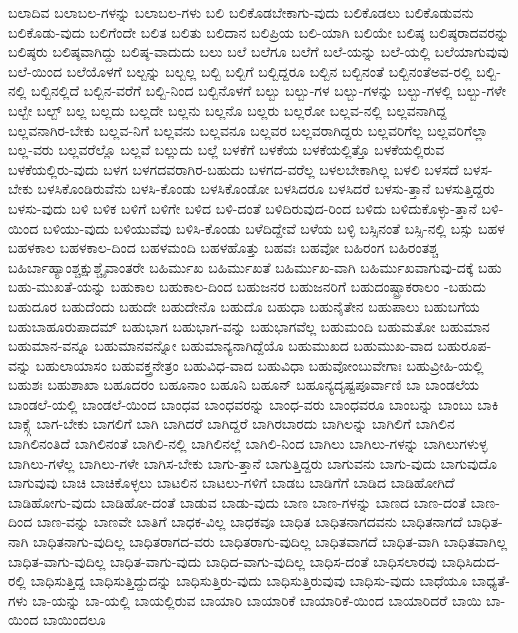 {ಬಲಾದಿವ
ಬಲಾಬಲ-ಗಳನ್ನು
ಬಲಾಬಲ-ಗಳು
ಬಲಿ
ಬಲಿಕೊಡಬೇಕಾಗು-ವುದು
ಬಲಿಕೊಡಲು
ಬಲಿಕೊಡುವನು
ಬಲಿಕೊಡು-ವುದು
ಬಲಿಗೆಂದೇ
ಬಲಿತ
ಬಲಿತು
ಬಲಿದಾನ
ಬಲಿಪ್ರಿಯ
ಬಲಿ-ಯಾಗಿ
ಬಲಿಯೇ
ಬಲಿಷ್ಠ
ಬಲಿಷ್ಠರಾದವರನ್ನು
ಬಲಿಷ್ಠರು
ಬಲಿಷ್ಠವಾಗಿದ್ದು
ಬಲಿಷ್ಠ-ವಾದುದು
ಬಲು
ಬಲೆ
ಬಲೆಗೂ
ಬಲೆಗೆ
ಬಲೆ-ಯನ್ನು
ಬಲೆ-ಯಲ್ಲಿ
ಬಲೆಯಾಗುವುವು
ಬಲೆ-ಯಿಂದ
ಬಲೆಯೊಳಗೆ
ಬಲ್ಬನ್ನು
ಬಲ್ಬಲ್ಲ
ಬಲ್ಬಿ
ಬಲ್ಬಿಗೆ
ಬಲ್ಬಿದ್ದರೂ
ಬಲ್ಬಿನ
ಬಲ್ಬಿನಂತೆ
ಬಲ್ಬಿನಂತೆಅವ-ರಲ್ಲಿ
ಬಲ್ಬಿ-ನಲ್ಲಿ
ಬಲ್ಬಿನಲ್ಲಿದೆ
ಬಲ್ಬಿನ-ವರೆಗೆ
ಬಲ್ಬಿ-ನಿಂದ
ಬಲ್ಬಿನೊಳಗೆ
ಬಲ್ಬು
ಬಲ್ಬು-ಗಳ
ಬಲ್ಬು-ಗಳನ್ನು
ಬಲ್ಬು-ಗಳಲ್ಲಿ
ಬಲ್ಬು-ಗಳೇ
ಬಲ್ಬೇ
ಬಲ್ಬ್
ಬಲ್ಲ
ಬಲ್ಲದು
ಬಲ್ಲದೇ
ಬಲ್ಲನು
ಬಲ್ಲನೊ
ಬಲ್ಲರು
ಬಲ್ಲರೋ
ಬಲ್ಲವ-ನಲ್ಲಿ
ಬಲ್ಲವನಾಗಿದ್ದ
ಬಲ್ಲವನಾಗಿರ-ಬೇಕು
ಬಲ್ಲವ-ನಿಗೆ
ಬಲ್ಲವನು
ಬಲ್ಲವನೂ
ಬಲ್ಲವರ
ಬಲ್ಲವರಾಗಿದ್ದರು
ಬಲ್ಲವರಿಗೆಲ್ಲ
ಬಲ್ಲವರಿಗೆಲ್ಲಾ
ಬಲ್ಲ-ವರು
ಬಲ್ಲವರೆಲ್ಲೊ
ಬಲ್ಲವೆ
ಬಲ್ಲುದು
ಬಲ್ಲೆ
ಬಳಕೆಗೆ
ಬಳಕೆಯ
ಬಳಕೆಯಲ್ಲಿತ್ತೊ
ಬಳಕೆಯಲ್ಲಿರುವ
ಬಳಕೆಯಲ್ಲಿರು-ವುದು
ಬಳಗ
ಬಳಗದವರಾಗಿರ-ಬಹುದು
ಬಳಗದ-ವರೆಲ್ಲ
ಬಳಲಬೇಕಾಗಿಲ್ಲ
ಬಳಲಿ
ಬಳಸದೆ
ಬಳಸ-ಬೇಕು
ಬಳಸಿಕೊಂಡಿರುವೆನು
ಬಳಸಿ-ಕೊಂಡು
ಬಳಸಿಕೊಂಡೋ
ಬಳಸಿದರೂ
ಬಳಸಿದರೆ
ಬಳಸು-ತ್ತಾನೆ
ಬಳಸುತ್ತಿದ್ದರು
ಬಳಸು-ವುದು
ಬಳಿ
ಬಳಿಕ
ಬಳಿಗೆ
ಬಳಿಗೇ
ಬಳಿದ
ಬಳಿ-ದಂತೆ
ಬಳಿದಿರುವುದ-ರಿಂದ
ಬಳಿದು
ಬಳಿದುಕೊಳ್ಳು-ತ್ತಾನೆ
ಬಳಿ-ಯಿಂದ
ಬಳಿಯು-ವುದು
ಬಳಿಯುವೆವು
ಬಳಿಸಿ-ಕೊಂಡು
ಬಳೆದಿದ್ದೇವೆ
ಬಳೆಯ
ಬಳ್ಳಿ
ಬಸ್ಸಿನಂತೆ
ಬಸ್ಸಿ-ನಲ್ಲಿ
ಬಸ್ಸು
ಬಹಳ
ಬಹಳಕಾಲ
ಬಹಳಕಾಲ-ದಿಂದ
ಬಹಳಮಂದಿ
ಬಹಳಹೊತ್ತು
ಬಹವಃ
ಬಹವೋ
ಬಹಿರಂಗ
ಬಹಿರಂತಶ್ಚ
ಬಹಿರ್ಬಾಹ್ಯಾಂಶ್ಚಕ್ಷುಶ್ಚೈವಾಂತರೇ
ಬಹಿರ್ಮುಖ
ಬಹಿರ್ಮುಖತೆ
ಬಹಿರ್ಮುಖ-ವಾಗಿ
ಬಹಿರ್ಮುಖವಾಗುವು-ದಕ್ಕೆ
ಬಹು
ಬಹು-ಮುಖತೆ-ಯನ್ನು
ಬಹುಕಾಲ
ಬಹುಕಾಲ-ದಿಂದ
ಬಹುಜನರ
ಬಹುಜನರಿಗೆ
ಬಹುದಂಷ್ಟ್ರಾಕರಾಲಂ
-ಬಹುದು
ಬಹುದೂರ
ಬಹುದೆಂದು
ಬಹುದೇ
ಬಹುದೇನೊ
ಬಹುದೊ
ಬಹುಧಾ
ಬಹುನೈತೇನ
ಬಹುಪಾಲು
ಬಹುಬಗೆಯ
ಬಹುಬಾಹೂರುಪಾದಮ್
ಬಹುಭಾಗ
ಬಹುಭಾಗ-ವನ್ನು
ಬಹುಭಾಗವೆಲ್ಲ
ಬಹುಮಂದಿ
ಬಹುಮತೋ
ಬಹುಮಾನ
ಬಹುಮಾನ-ವನ್ನೂ
ಬಹುಮಾನವನ್ನೋ
ಬಹುಮಾನ್ಯನಾಗಿದ್ದೆಯೊ
ಬಹುಮುಖದ
ಬಹುಮುಖ-ವಾದ
ಬಹುರೂಪ-ವನ್ನು
ಬಹುಲಾಯಾಸಂ
ಬಹುವಕ್ತ್ರನೇತ್ರಂ
ಬಹುವಿಧ-ವಾದ
ಬಹುವಿಧಾ
ಬಹುವೋಂಬುವೇಗಾಃ
ಬಹುವ್ರೀಹಿ-ಯಲ್ಲಿ
ಬಹುಶಃ
ಬಹುಶಾಖಾ
ಬಹೂದರಂ
ಬಹೂನಾಂ
ಬಹೂನಿ
ಬಹೂನ್
ಬಹೂನ್ಯದೃಷ್ಟಪೂರ್ವಾಣಿ
ಬಾ
ಬಾಂಡಲೆಯ
ಬಾಂಡಲೆ-ಯಲ್ಲಿ
ಬಾಂಡಲೆ-ಯಿಂದ
ಬಾಂಧವ
ಬಾಂಧವರನ್ನು
ಬಾಂಧ-ವರು
ಬಾಂಧವರೂ
ಬಾಂಬನ್ನು
ಬಾಂಬು
ಬಾಕಿ
ಬಾಕ್ಸ್ಗೆ
ಬಾಗ-ಬೇಕು
ಬಾಗಲಿಗೆ
ಬಾಗಿ
ಬಾಗಿದರೆ
ಬಾಗಿದ್ದರೆ
ಬಾಗಿರಬಾರದು
ಬಾಗಿಲನ್ನು
ಬಾಗಿಲಿಗೆ
ಬಾಗಿಲಿನ
ಬಾಗಿಲಿನಂತಿದೆ
ಬಾಗಿಲಿನಂತೆ
ಬಾಗಿಲಿ-ನಲ್ಲಿ
ಬಾಗಿಲಿನಲ್ಲೆ
ಬಾಗಿಲಿ-ನಿಂದ
ಬಾಗಿಲು
ಬಾಗಿಲು-ಗಳನ್ನು
ಬಾಗಿಲುಗಳುಳ್ಳ
ಬಾಗಿಲು-ಗಳೆಲ್ಲ
ಬಾಗಿಲು-ಗಳೇ
ಬಾಗಿಸ-ಬೇಕು
ಬಾಗು-ತ್ತಾನೆ
ಬಾಗುತ್ತಿದ್ದರು
ಬಾಗುವನು
ಬಾಗು-ವುದು
ಬಾಗುವುದೊ
ಬಾಗುವುವು
ಬಾಚಿ
ಬಾಚಿಕೊಳ್ಳಲು
ಬಾಟಲಿನ
ಬಾಟಲು-ಗಳಿಗೆ
ಬಾಡಬ
ಬಾಡಿಗೆಗೆ
ಬಾಡಿದ
ಬಾಡಿಹೋಗಿದೆ
ಬಾಡಿಹೋಗು-ವುದು
ಬಾಡಿಹೋ-ದಂತೆ
ಬಾಡುವ
ಬಾಡು-ವುದು
ಬಾಣ
ಬಾಣ-ಗಳನ್ನು
ಬಾಣದ
ಬಾಣ-ದಂತೆ
ಬಾಣ-ದಿಂದ
ಬಾಣ-ವನ್ನು
ಬಾಣವೇ
ಬಾತಿಗೆ
ಬಾಧಕ-ವಿಲ್ಲ
ಬಾಧಕವೂ
ಬಾಧಿತ
ಬಾಧಿತನಾಗದವನು
ಬಾಧಿತನಾಗದೆ
ಬಾಧಿತ-ನಾಗಿ
ಬಾಧಿತನಾಗು-ವುದಿಲ್ಲ
ಬಾಧಿತರಾಗದ-ವರು
ಬಾಧಿತರಾಗು-ವುದಿಲ್ಲ
ಬಾಧಿತವಾಗದೆ
ಬಾಧಿತ-ವಾಗಿ
ಬಾಧಿತವಾಗಿಲ್ಲ
ಬಾಧಿತ-ವಾಗು-ವುದಿಲ್ಲ
ಬಾಧಿತ-ವಾಗು-ವುದು
ಬಾಧಿದ-ವಾಗು-ವುದಿಲ್ಲ
ಬಾಧಿಸ-ದಂತೆ
ಬಾಧಿಸಲಾರವು
ಬಾಧಿಸಿದುದ-ರಲ್ಲಿ
ಬಾಧಿಸುತ್ತಿದ್ದ
ಬಾಧಿಸುತ್ತಿದ್ದುದನ್ನು
ಬಾಧಿಸುತ್ತಿರು-ವುದು
ಬಾಧಿಸುತ್ತಿರುವುವು
ಬಾಧಿಸು-ವುದು
ಬಾಧೆಯೂ
ಬಾಧ್ಯತೆ-ಗಳು
ಬಾ-ಯನ್ನು
ಬಾ-ಯಲ್ಲಿ
ಬಾಯಲ್ಲಿರುವ
ಬಾಯಾರಿ
ಬಾಯಾರಿಕೆ
ಬಾಯಾರಿಕೆ-ಯಿಂದ
ಬಾಯಾರಿದರೆ
ಬಾಯಿ
ಬಾ-ಯಿಂದ
ಬಾಯಿಂದಲೂ
}

